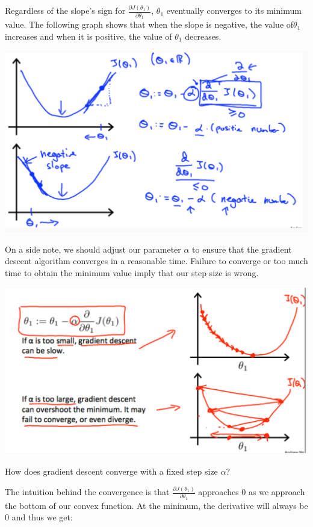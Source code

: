 \documentclass[10pt,a4paper,UTF8]{article}
\begin{document}
Regardless of the slope's sign for \(\frac{\partial J(\theta_{1})}{\partial \theta_{1}}\), \(\theta_{1}\) eventually converges to its minimum value. The following graph shows that when the slope is negative, the value of\(\theta_{1}\) increases and when it is positive, the value of \(\theta_{1}\) decreases.
\begin{center}
\includegraphics[width=.9\linewidth]{../../img/computer_ng/20171006gradientDescent1.png}
\end{center}

On a side note, we should adjust our parameter \(\alpha\) to ensure that the gradient descent algorithm converges in a reasonable time. Failure to converge or too much time to obtain the minimum value imply that our step size is wrong.
\begin{center}
\includegraphics[width=.9\linewidth]{../../img/computer_ng/20171006gradientDescent2.png}
\end{center}

How does gradient descent converge with a fixed step size \(\alpha\)?

The intuition behind the convergence is that \(\frac{\partial J(\theta_{1})}{\partial \theta_{1}}\) approaches 0 as we approach the bottom of our convex function. At the minimum, the derivative will always be 0 and thus we get:
\end{document}

